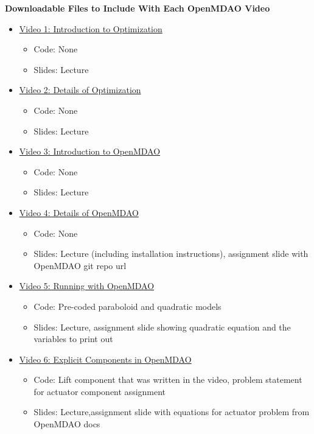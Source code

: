 \documentclass[12pt, letterpaper]{article}
\begin{document}
\centerline{\textbf{Downloadable Files to Include With Each OpenMDAO Video}} 

\begin{itemize}


	\item \underline{Video 1: Introduction to Optimization}
		\begin{itemize}
			\item Code: None
			\item Slides: Lecture
		\end{itemize}

	\item \underline{Video 2: Details of Optimization}
		\begin{itemize}
			\item Code: None
			\item Slides: Lecture
		\end{itemize}

	\item \underline{Video 3: Introduction to OpenMDAO} 
		\begin{itemize}
			\item Code: None
			\item Slides: Lecture
		\end{itemize}

	\item \underline{Video 4: Details of OpenMDAO}
		\begin{itemize}
			\item Code: None
			\item Slides: Lecture (including installation instructions), assignment slide with OpenMDAO git repo url
		\end{itemize}

	\item \underline{Video 5: Running with OpenMDAO}
		\begin{itemize}
			\item Code: Pre-coded paraboloid and quadratic models
			\item Slides: Lecture, assignment slide showing quadratic equation and the variables to print out
		\end{itemize}

	\item \underline{Video 6: Explicit Components in OpenMDAO}
		\begin{itemize}
			\item Code: Lift component that was written in the video, problem statement for actuator component assignment
			\item Slides: Lecture,assignment slide with equations for actuator problem from OpenMDAO docs
		\end{itemize}


\end{itemize}
\end{document}
